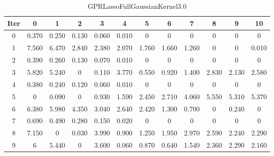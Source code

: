 \begin{table}
	\begin{center}
		\begin{tabular}{|c|c|c|c|c|c|c|c|c|c|c|c|}
			\hline
			Iter & 0 & 1 & 2 & 3 & 4 & 5 & 6 & 7 & 8 & 9 & 10 \\
			\hline
			0 & 0.370 & 0.250 & 0.130 & 0.060 & 0.010 & 0 & 0 & 0 & 0 & 0 & 0 \\
			\hline
			1 & 7.560 & 6.470 & 2.840 & 2.380 & 2.070 & 1.760 & 1.660 & 1.260 & 0 & 0 & 0.010 \\
			\hline
			2 & 0.390 & 0.260 & 0.130 & 0.070 & 0.010 & 0 & 0 & 0 & 0 & 0 & 0 \\
			\hline
			3 & 5.820 & 5.240 & 0 & 0.110 & 3.770 & 0.550 & 0.920 & 1.400 & 2.830 & 2.130 & 2.580 \\
			\hline
			4 & 0.380 & 0.240 & 0.120 & 0.060 & 0.010 & 0 & 0 & 0 & 0 & 0 & 0 \\
			\hline
			5 & 0 & 0.090 & 0 & 0.930 & 1.590 & 2.450 & 2.710 & 4.060 & 5.550 & 5.310 & 5.370 \\
			\hline
			6 & 6.380 & 5.980 & 4.350 & 3.040 & 2.640 & 2.420 & 1.300 & 0.700 & 0 & 0.240 & 0 \\
			\hline
			7 & 0.690 & 0.490 & 0.280 & 0.150 & 0.020 & 0 & 0 & 0 & 0 & 0 & 0 \\
			\hline
			8 & 7.150 & 0 & 0.030 & 3.990 & 0.900 & 1.250 & 1.950 & 2.970 & 2.590 & 2.240 & 2.290 \\
			\hline
			9 & 6 & 5.440 & 0 & 3.600 & 0.060 & 0.870 & 0.640 & 1.540 & 2.360 & 2.290 & 2.160 \\
			\hline
		\end{tabular}
	\end{center}
	\caption{GPRLassoFullGaussianKernel3.0}
\end{table}